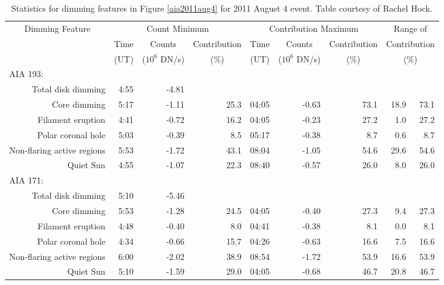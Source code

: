 \begin{table}
\small
\caption[2011 August 4 event statistics]{
    Statistics for dimming features in Figure \ref{aia2011aug4} for 2011 August 4 event. Table courtesy of Rachel Hock. 
}
\begin{center}
\begin{tabular}{r|rrr|rrr|r@{-}r}
\multicolumn{1}{c|}{\multirow{3}{*}{Dimming Feature}}& \multicolumn{3}{c|}{Count Minimum} & \multicolumn{3}{c|}{Contribution Maximum} & \multicolumn{2}{c}{Range of} \\
& \multicolumn{1}{c|}{Time} & \multicolumn{1}{c|}{Counts} & \multicolumn{1}{c|}{Contribution} & \multicolumn{1}{c|}{Time} & \multicolumn{1}{c|}{Counts} & \multicolumn{1}{c|}{Contribution} & \multicolumn{2}{c}{Contribution}\\
& \multicolumn{1}{c|}{(UT)} & \multicolumn{1}{c|}{($10^6$ DN/s)} & \multicolumn{1}{c|}{(\%)} & \multicolumn{1}{c|}{(UT)} & \multicolumn{1}{c|}{($10^6$ DN/s)} & \multicolumn{1}{c|}{(\%)} & \multicolumn{2}{c}{(\%)} \\
\hline \hline
\multicolumn{1}{l}{AIA 193:} \\
\hline
Total disk dimming & 4:55 & -4.81 & & & & & \\
Core dimming & 5:17 & -1.11 & 25.3 & 04:05 & -0.63 & 73.1 & 18.9 & 73.1 \\
Filament eruption & 4:41 & -0.72 & 16.2 & 04:05 & -0.23 & 27.2 &  1.0 & 27.2 \\
Polar coronal hole & 5:03 & -0.39 & 8.5 & 05:17 & -0.38 & 8.7 &  0.6 & 8.7 \\
Non-flaring active regions & 5:53 & -1.72 & 43.1 & 08:04 & -1.05 & 54.6 & 29.6 & 54.6 \\
Quiet Sun & 4:55 & -1.07 & 22.3 & 08:40 & -0.57 & 26.0 &  8.0 & 26.0 \\
\multicolumn{1}{l}{AIA 171:} \\
\hline
Total disk dimming & 5:10 & -5.46 & & & & & \\
Core dimming & 5:53 & -1.28 & 24.5 & 04:05 & -0.40 & 27.3 &  9.4 & 27.3 \\
Filament eruption & 4:48 & -0.40 & 8.0 & 04:41 & -0.38 & 8.1 &  0.0 & 8.1 \\
Polar coronal hole & 4:34 & -0.66 & 15.7 & 04:26 & -0.63 & 16.6 &  7.5 & 16.6 \\
Non-flaring active regions & 6:00 & -2.02 & 38.9 & 08:54 & -1.72 & 53.9 & 16.6 & 53.9 \\
Quiet Sun & 5:10 & -1.59 & 29.0 & 04:05 & -0.68 & 46.7 & 20.8 & 46.7 \\

\end{tabular}
\end{center}
\end{table}
